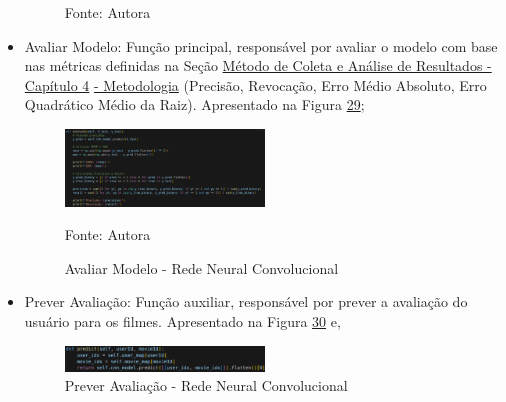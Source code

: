 \begin{itemize}
\begin{figure}[htbp]
        \vspace{2pt} %
        
        \small Fonte: Autora
    \end{figure}

    \item Avaliar Modelo: Função principal, responsável por avaliar o modelo com base nas métricas definidas na Seção 
    \hyperref[sec:meteanresul]{Método de Coleta e Análise de Resultados - Capítulo 4}
    \hyperref[sec:meteanresul]{ - Metodologia} 
    (Precisão, Revocação, Erro Médio Absoluto, Erro Quadrático Médio da Raiz).
    Apresentado na Figura \hyperref[fig:evaluate-cnn]{29};
    \begin{figure}[htbp]
        \centering
        \caption{Avaliar Modelo - Rede Neural Convolucional}
        \label{fig:evaluate-cnn}
        
        \vspace{2pt} %
        
        \includegraphics[width=0.5\textwidth]{figuras/evaluate-cnn.eps}
        
        \vspace{2pt} %
        
        \small Fonte: Autora
    \end{figure}

    \item Prever Avaliação: Função auxiliar, responsável por prever a avaliação do usuário para os filmes. Apresentado na
    Figura \hyperref[fig:pred-cnn]{30} e,
    \begin{figure}[htbp]
        \centering
        \caption{Prever Avaliação - Rede Neural Convolucional}
        \label{fig:pred-cnn}
        
        \vspace{2pt} %
        
        \includegraphics[width=0.5\textwidth]{figuras/pred-cnn.eps}
        

\end{figure}
\end{itemize}
